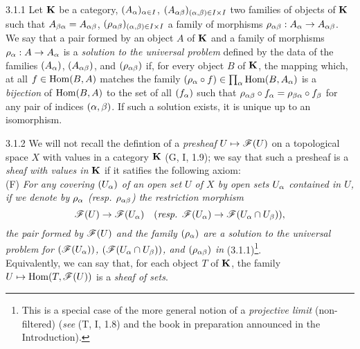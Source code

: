 \documentclass[../main.tex]{subfiles}
\begin{document}
\begin{cx}{3.1.1}
Let $\mathbf{K}$ be a category, $(A_\alpha)_{\alpha\in I}$,
$(A_{\alpha\beta})_{(\alpha,\beta)\in I\times I}$ two families of objects
of $\mathbf{K}$ such that $A_{\beta\alpha}=A_{\alpha\beta}$,
$(\rho_{\alpha\beta})_{(\alpha,\beta)\in I\times I}$ a family of morphisms
$\rho_{\alpha\beta}:A_\alpha\to A_{\alpha\beta}$. We say that a pair formed by
an object $A$ of $\mathbf{K}$ and a family of morphisms $\rho_\alpha:A\to A_\alpha$ 
is a \emph{solution to the universal problem} defined by the data of the families
$(A_\alpha)$, $(A_{\alpha\beta})$, and $(\rho_{\alpha\beta})$ if, for every object $B$
of $\mathbf{K}$, the mapping which, at all $f\in\operatorname*{Hom}(B,A)$ matches the
family $(\rho_\alpha\circ f)\in\prod_\alpha\operatorname*{Hom}(B,A_\alpha)$ is a \emph{bijection}
of $\operatorname*{Hom}(B,A)$ to the set of all $(f_\alpha)$ such that
$\rho_{\alpha\beta}\circ f_\alpha=\rho_{\beta\alpha}\circ f_\beta$ for any pair of
indices $(\alpha,\beta)$. If such a solution exists, it is unique up to an isomorphism.
\end{cx}

\begin{cx}{3.1.2}
We will not recall the defintion of a \emph{presheaf} $U\mapsto\mathscr{F}(U)$ on a
topological space $X$ with values in a category $\mathbf{K}$ (G, I, 1.9); we say that
such a presheaf is a \emph{sheaf with values in} $\mathbf{K}$ if it satifies the following
axiom:\\

(F) \emph{For any covering $(U_\alpha)$ of an open set $U$ of $X$ by open sets
   $U_\alpha$ contained in $U$, if we denote by $\rho_\alpha$ (resp. $\rho_{\alpha\beta}$) the
   restriction morphism}
   \[
     \mathscr{F}(U)\to\mathscr{F}(U_\alpha)\quad(\text{\emph{resp. }}\mathscr{F}(U_\alpha)\to\mathscr{F}(U_\alpha\cap U_\beta)),
   \]
   \emph{the pair formed by $\mathscr{F}(U)$ and the family $(\rho_\alpha)$ are a solution to
   the universal problem for $(\mathscr{F}(U_\alpha))$, $(\mathscr{F}(U_\alpha\cap U_\beta))$, and $(\rho_{\alpha\beta})$
   in} (3.1.1)\footnote{This is a special case of the more general notion of a
   \emph{projective limit} (non-filtered) (\emph{see} (T, I, 1.8) and the book in
   preparation announced in the Introduction).}.\\

Equivalently, we can say that, for each object $T$ of $\mathbf{K}$, the family
$U\mapsto\operatorname*{Hom}(T,\mathscr{F}(U))$ is a \emph{sheaf of sets}.
\end{cx}
\end{document}
